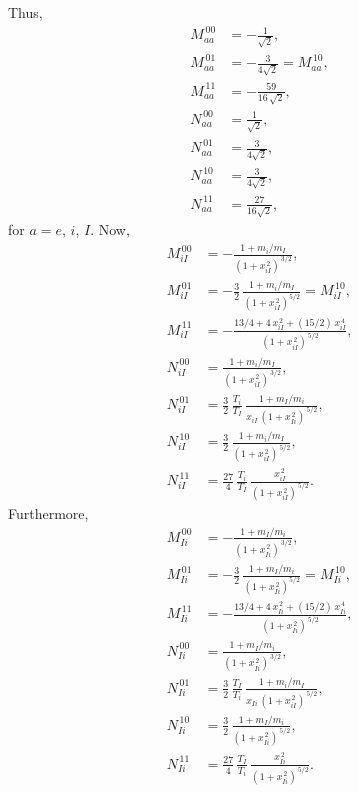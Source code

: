 \documentclass[12pt]{article}
\begin{document}
Thus, 
\begin{align}
M_{aa}^{\,00} &= -\frac{1}{\sqrt{2}},\\[0.5ex]
M_{aa}^{\,01}&= -\frac{3}{4\sqrt{2}}= M_{aa}^{\,10},\\[0.5ex]
M_{aa}^{\,11}& = -\frac{59}{16\,\sqrt{2}},\\[0.5ex]
N_{aa}^{\,00} &= \frac{1}{\sqrt{2}},\\[0.5ex]
N_{aa}^{\,01}&= \frac{3}{4\sqrt{2}},\\[0.5ex]
N_{aa}^{\,10}&=\frac{3}{4\sqrt{2}},\\[0.5ex]
N_{aa}^{\,11}& =\frac{27}{16\sqrt{2}},
\end{align}
for $a=e$, $i$, $I$.  Now, 
\begin{align}
M_{iI}^{\,00} &= -\frac{1+m_i/m_I}{(1+x_{iI}^{\,2})^{\,3/2}},\\[0.5ex]
M_{iI}^{\,01}&= -\frac{3}{2}\,\frac{1+m_i/m_I}{(1+x_{iI}^{\,2})^{5/2}}= M_{iI}^{\,10},\\[0.5ex]
M_{iI}^{\,11}& = -\frac{13/4+4\,x_{iI}^{\,2}+(15/2)\,x_{iI}^{\,4}}{(1+x_{iI}^{\,2})^{\,5/2}},\\[0.5ex]
N_{iI}^{\,00} &= \frac{1+m_i/m_I}{(1+x_{iI}^{\,2})^{\,3/2}},\\[0.5ex]
N_{iI}^{\,01}&= \frac{3}{2}\,\frac{T_i}{T_I}\,\frac{1+m_I/m_i}{x_{iI}\,(1+x_{Ii}^{\,2})^{\,5/2}},\\[0.5ex]
N_{iI}^{\,10}&=\frac{3}{2}\,\frac{1+m_i/m_I}{(1+x_{iI}^{\,2})^{\,5/2}},\\[0.5ex]
N_{iI}^{\,11}& =\frac{27}{4}\,\frac{T_i}{T_I}\,\frac{x_{iI}^{\,2}}{(1+x_{iI}^{\,2})^{\,5/2}}.
\end{align}
Furthermore, 
\begin{align}
M_{Ii}^{\,00} &= -\frac{1+m_I/m_i}{(1+x_{Ii}^{\,2})^{\,3/2}},\\[0.5ex]
M_{Ii}^{\,01}&= -\frac{3}{2}\,\frac{1+m_I/m_i}{(1+x_{Ii}^{\,2})^{5/2}}= M_{Ii}^{\,10},\\[0.5ex]
M_{Ii}^{\,11}& = -\frac{13/4+4\,x_{Ii}^{\,2}+(15/2)\,x_{Ii}^{\,4}}{(1+x_{Ii}^{\,2})^{\,5/2}},\\[0.5ex]
N_{Ii}^{\,00} &= \frac{1+m_I/m_i}{(1+x_{Ii}^{\,2})^{\,3/2}},\\[0.5ex]
N_{Ii}^{\,01}&= \frac{3}{2}\,\frac{T_I}{T_i}\,\frac{1+m_i/m_I}{x_{Ii}\,(1+x_{iI}^{\,2})^{\,5/2}},\\[0.5ex]
N_{Ii}^{\,10}&=\frac{3}{2}\,\frac{1+m_I/m_i}{(1+x_{Ii}^{\,2})^{\,5/2}},\\[0.5ex]
N_{Ii}^{\,11}& =\frac{27}{4}\,\frac{T_I}{T_i}\,\frac{x_{Ii}^{\,2}}{(1+x_{Ii}^{\,2})^{\,5/2}}.
\end{align}
\end{document}
